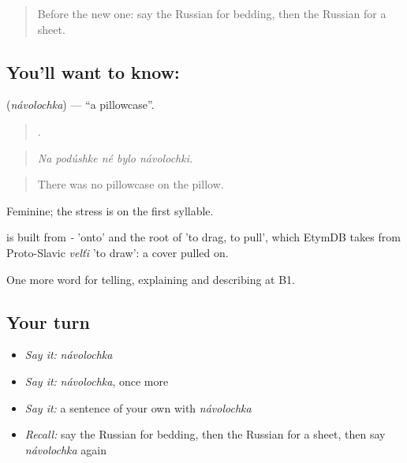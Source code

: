 \label{lesson:RU-C430-navolochka}



\begin{quote}
Before the new one: say the Russian for bedding, then the Russian for a sheet.
\end{quote}

\subsection*{You'll want to know: }
\textbf{} (\emph{návolochka}) — \textquotedblleft{}a pillowcase\textquotedblright{}.

\begin{quote}
    .
\end{quote}

\begin{quote}
\emph{Na podúshke né bylo návolochki.}
\end{quote}

\begin{quote}
There was no pillowcase on the pillow.
\end{quote}

Feminine; the stress is on the first syllable.

\begin{cousinweb}
\emph{} is built from \emph{-} 'onto' and the root of \emph{} 'to drag, to pull', which EtymDB takes from Proto-Slavic \emph{velťi} 'to draw': a cover pulled on.
\end{cousinweb}

\begin{grammarlens}[title={What you've built}]
One more word for telling, explaining and describing at B1.
\end{grammarlens}

\subsection*{Your turn}
\begin{itemize}
\raggedright
  \item \emph{Say it:} \emph{návolochka}
  \item \emph{Say it:} \emph{návolochka}, once more
  \item \emph{Say it:} a sentence of your own with \emph{návolochka}
  \item \emph{Recall:} say the Russian for bedding, then the Russian for a sheet, then say \emph{návolochka} again
\end{itemize}

